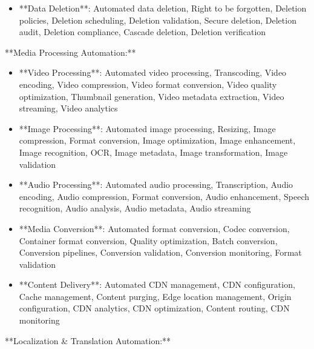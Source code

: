 \documentclass[11pt,a4paper]{article}
\begin{document}
\begin{itemize}
\item **Data Deletion**: Automated data deletion, Right to be forgotten, Deletion policies, Deletion scheduling, Deletion validation, Secure deletion, Deletion audit, Deletion compliance, Cascade deletion, Deletion verification
\end{itemize}

**Media Processing Automation:**

\begin{itemize}
\item **Video Processing**: Automated video processing, Transcoding, Video encoding, Video compression, Video format conversion, Video quality optimization, Thumbnail generation, Video metadata extraction, Video streaming, Video analytics
\end{itemize}

\begin{itemize}
\item **Image Processing**: Automated image processing, Resizing, Image compression, Format conversion, Image optimization, Image enhancement, Image recognition, OCR, Image metadata, Image transformation, Image validation
\end{itemize}

\begin{itemize}
\item **Audio Processing**: Automated audio processing, Transcription, Audio encoding, Audio compression, Format conversion, Audio enhancement, Speech recognition, Audio analysis, Audio metadata, Audio streaming
\end{itemize}

\begin{itemize}
\item **Media Conversion**: Automated format conversion, Codec conversion, Container format conversion, Quality optimization, Batch conversion, Conversion pipelines, Conversion validation, Conversion monitoring, Format validation
\end{itemize}

\begin{itemize}
\item **Content Delivery**: Automated CDN management, CDN configuration, Cache management, Content purging, Edge location management, Origin configuration, CDN analytics, CDN optimization, Content routing, CDN monitoring
\end{itemize}

**Localization \& Translation Automation:**
\end{document}
